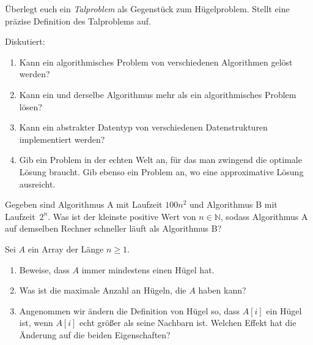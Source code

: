 \documentclass{uebung_cs}
\begin{document}
\begin{aufgabe}
	Überlegt euch ein \emph{Talproblem} als Gegenstück zum Hügelproblem.
	Stellt eine präzise Definition des Talproblems auf.
\end{aufgabe}

\begin{aufgabe} Diskutiert:
	\begin{enumerate}
		\item Kann ein algorithmisches Problem von verschiedenen Algorithmen gelöst werden?
		\item Kann ein und derselbe Algorithmus mehr als ein algorithmisches Problem lösen?
		\item Kann ein abstrakter Datentyp von verschiedenen Datenstrukturen implementiert werden?
		\item Gib ein Problem in der echten Welt an, für das man zwingend die optimale Lösung braucht. Gib ebenso ein Problem an, wo eine approximative Lösung ausreicht.
	\end{enumerate}	
\end{aufgabe}

\begin{aufgabe}[\bestehen]
	Gegeben sind Algorithmus A mit Laufzeit $100n^2$ und Algorithmus B mit Laufzeit~$2^n$.
	Was ist der kleinste positive Wert von $n\in\mathbb{N}$, sodass Algorithmus A auf demselben Rechner schneller läuft als Algorithmus B?
\end{aufgabe}

\begin{aufgabe}
	Sei $A$ ein Array der Länge $n\ge 1$.
	\begin{enumerate}
		\item Beweise, dass $A$ immer mindestens einen Hügel hat.
		\item Was ist die maximale Anzahl an Hügeln, die $A$ haben kann?
		\item Angenommen wir ändern die Definition von Hügel so, dass $A[i]$ ein Hügel ist, wenn $A[i]$ echt größer als seine Nachbarn ist. Welchen Effekt hat die Änderung auf die beiden Eigenschaften?
	\end{enumerate}
\end{aufgabe}
\end{document}
